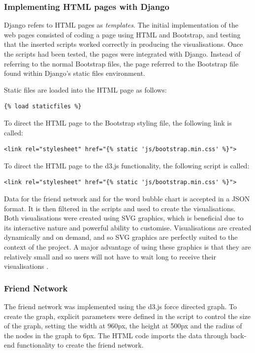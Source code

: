 \documentclass[12pt,onecolumn]{article}
\begin{document}
	\subsubsection{Implementing HTML pages with Django}
	Django refers to HTML pages as \textit{templates}. The initial implementation of the web pages consisted of coding a page using HTML and Bootstrap, and testing that the inserted scripts worked correctly in producing the visualisations. Once the scripts had been tested, the pages were integrated with Django. Instead of referring to the normal Bootstrap files, the page referred to the Bootstrap file found within Django's static files environment.
	
	Static files are loaded into the HTML page as follows:
	\begin{lstlisting}
{% load staticfiles %}
	\end{lstlisting}
	
	To direct the HTML page to the Bootstrap styling file, the following link is called:
		\begin{lstlisting}
<link rel="stylesheet" href="{% static 'js/bootstrap.min.css' %}">
		\end{lstlisting}
	To direct the HTML page to the d3.js functionality, the following script is called:
		\begin{lstlisting}
<link rel="stylesheet" href="{% static 'js/bootstrap.min.css' %}">
		\end{lstlisting}
		
	Data for the friend network and for the word bubble chart is accepted in a JSON format. It is then filtered in the scripts and used to create the visualisations. Both visualisations were created using SVG  graphics, which is beneficial due to its interactive nature and powerful ability to customise. Visualisations are created dynamically and on demand, and so SVG graphics are perfectly suited to the context of the project. A major advantage of using these graphics is that they are relatively small and so users will not have to wait long to receive their visualisations \cite{SVG}.
	
	\subsubsection{Friend Network}
	The friend network was implemented using the d3.js force directed graph. To create the graph, explicit parameters were defined in the script to control the size of the graph, setting the width at 960px, the height at 500px and the radius of the  nodes in the graph to 6px. The HTML code imports the data through back-end functionality to create the friend network. 
	
\end{document}
